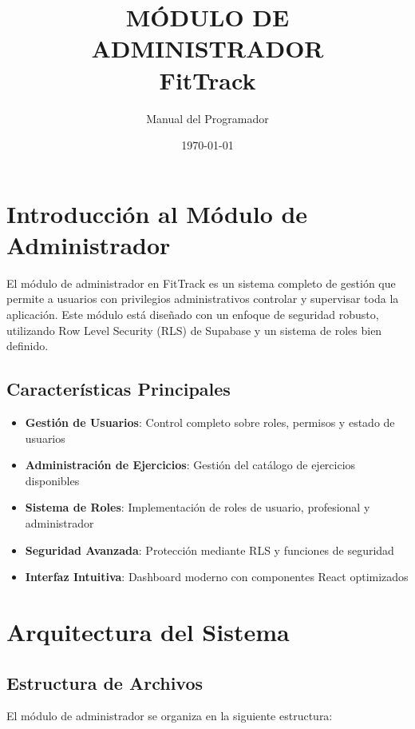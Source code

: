 \documentclass[12pt,a4paper]{article}
\title{\textbf{MÓDULO DE ADMINISTRADOR\\FitTrack}}
\author{Manual del Programador}
\date{\today}
\begin{document}
	
	\maketitle
	
	\tableofcontents
	\newpage
	
	\section{Introducción al Módulo de Administrador}
	
	El módulo de administrador en FitTrack es un sistema completo de gestión que permite a usuarios con privilegios administrativos controlar y supervisar toda la aplicación. Este módulo está diseñado con un enfoque de seguridad robusto, utilizando Row Level Security (RLS) de Supabase y un sistema de roles bien definido.
	
	\subsection{Características Principales}
	
	\begin{itemize}[leftmargin=2cm]
		\item \textbf{Gestión de Usuarios}: Control completo sobre roles, permisos y estado de usuarios
		\item \textbf{Administración de Ejercicios}: Gestión del catálogo de ejercicios disponibles
		\item \textbf{Sistema de Roles}: Implementación de roles de usuario, profesional y administrador
		\item \textbf{Seguridad Avanzada}: Protección mediante RLS y funciones de seguridad
		\item \textbf{Interfaz Intuitiva}: Dashboard moderno con componentes React optimizados
	\end{itemize}
	
	\section{Arquitectura del Sistema}
	
	\subsection{Estructura de Archivos}
	
	El módulo de administrador se organiza en la siguiente estructura:
	
\end{document}
